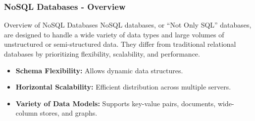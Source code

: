 \documentclass[aspectratio=169]{beamer}
\begin{document}
\begin{frame}[fragile]
    \frametitle{NoSQL Databases - Overview}
    \begin{block}{Overview of NoSQL Databases}
        NoSQL databases, or ``Not Only SQL'' databases, are designed to handle a wide variety of data types and large volumes of unstructured or semi-structured data. They differ from traditional relational databases by prioritizing flexibility, scalability, and performance.
    \end{block}
    \begin{itemize}
        \item \textbf{Schema Flexibility:} Allows dynamic data structures.
        \item \textbf{Horizontal Scalability:} Efficient distribution across multiple servers.
        \item \textbf{Variety of Data Models:} Supports key-value pairs, documents, wide-column stores, and graphs.
    \end{itemize}
\end{frame}
\end{document}
